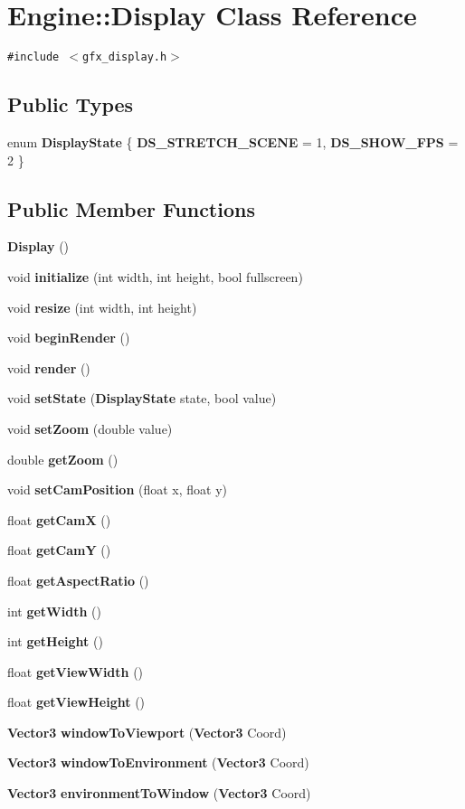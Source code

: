 \section{Engine::Display Class Reference}
\label{classEngine_1_1Display}
{\tt \#include $<$gfx\_\-display.h$>$}

\subsection*{Public Types}
\begin{CompactItemize}
\item 
enum {\bf DisplayState} \{ {\bf DS\_\-STRETCH\_\-SCENE} =  1, 
{\bf DS\_\-SHOW\_\-FPS} =  2
 \}
\end{CompactItemize}
\subsection*{Public Member Functions}
\begin{CompactItemize}
\item 
{\bf Display} ()
\item 
void {\bf initialize} (int width, int height, bool fullscreen)
\item 
void {\bf resize} (int width, int height)
\item 
void {\bf beginRender} ()
\item 
void {\bf render} ()
\item 
void {\bf setState} ({\bf DisplayState} state, bool value)
\item 
void {\bf setZoom} (double value)
\item 
double {\bf getZoom} ()
\item 
void {\bf setCamPosition} (float x, float y)
\item 
float {\bf getCamX} ()
\item 
float {\bf getCamY} ()
\item 
float {\bf getAspectRatio} ()
\item 
int {\bf getWidth} ()
\item 
int {\bf getHeight} ()
\item 
float {\bf getViewWidth} ()
\item 
float {\bf getViewHeight} ()
\item 
{\bf Vector3} {\bf windowToViewport} ({\bf Vector3} Coord)
\item 
{\bf Vector3} {\bf windowToEnvironment} ({\bf Vector3} Coord)
\item 
{\bf Vector3} {\bf environmentToWindow} ({\bf Vector3} Coord)
\end{CompactItemize}


